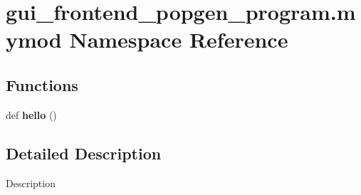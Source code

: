 \hypertarget{namespacegui__frontend__popgen__program_1_1mymod}{}\section{gui\+\_\+frontend\+\_\+popgen\+\_\+program.\+mymod Namespace Reference}
\label{namespacegui__frontend__popgen__program_1_1mymod}
\subsection*{Functions}
\begin{DoxyCompactItemize}
\item 
def {\bfseries hello} ()\hypertarget{namespacegui__frontend__popgen__program_1_1mymod_a1965ccac92a94b60ca204b9ed17a2bae}{}\label{namespacegui__frontend__popgen__program_1_1mymod_a1965ccac92a94b60ca204b9ed17a2bae}

\end{DoxyCompactItemize}


\subsection{Detailed Description}
\begin{DoxyVerb}Description
\end{DoxyVerb}
 
